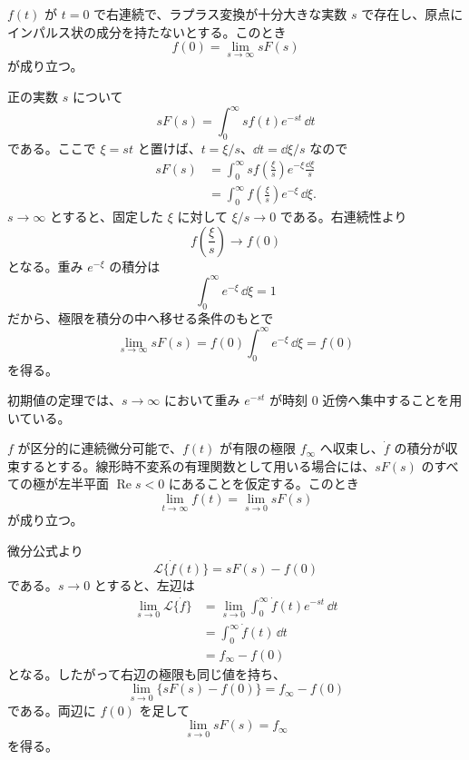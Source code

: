 \begin{theorem}[初期値の定理]
$f(t)$ が $t=0$ で右連続で、ラプラス変換が十分大きな実数 $s$ で存在し、原点にインパルス状の成分を持たないとする。このとき
\begin{equation}
  f(0)=\lim_{s\to\infty}sF(s)
  \label{eq:initial-value-theorem}
\end{equation}
が成り立つ。
\end{theorem}

正の実数 $s$ について
\begin{equation}
  sF(s)=\int_0^\infty s f(t)e^{-st}\,\dd t
\end{equation}
である。ここで $\xi=st$ と置けば、$t=\xi/s$、$\dd t=\dd\xi/s$ なので
\begin{align}
  sF(s)
  &=\int_0^\infty s f\left(\frac{\xi}{s}\right)e^{-\xi}\frac{\dd\xi}{s}\\
  &=\int_0^\infty f\left(\frac{\xi}{s}\right)e^{-\xi}\,\dd\xi.
\end{align}
$s\to\infty$ とすると、固定した $\xi$ に対して $\xi/s\to0$ である。右連続性より
\begin{equation}
  f\left(\frac{\xi}{s}\right)\to f(0)
\end{equation}
となる。重み $e^{-\xi}$ の積分は
\begin{equation}
  \int_0^\infty e^{-\xi}\,\dd\xi=1
\end{equation}
だから、極限を積分の中へ移せる条件のもとで
\begin{equation}
  \lim_{s\to\infty}sF(s)=f(0)\int_0^\infty e^{-\xi}\,\dd\xi=f(0)
\end{equation}
を得る。

初期値の定理では、$s\to\infty$ において重み $e^{-st}$ が時刻 $0$ 近傍へ集中することを用いている。

\begin{theorem}[最終値の定理]
$f$ が区分的に連続微分可能で、$f(t)$ が有限の極限 $f_\infty$ へ収束し、$\dot{f}$ の積分が収束するとする。線形時不変系の有理関数として用いる場合には、$sF(s)$ のすべての極が左半平面 $\operatorname{Re}s<0$ にあることを仮定する。このとき
\begin{equation}
  \lim_{t\to\infty}f(t)=\lim_{s\to0}sF(s)
  \label{eq:final-value-theorem}
\end{equation}
が成り立つ。
\end{theorem}

微分公式より
\begin{equation}
  \mathcal{L}\{\dot{f}(t)\}=sF(s)-f(0)
\end{equation}
である。$s\to0$ とすると、左辺は
\begin{align}
  \lim_{s\to0}\mathcal{L}\{\dot{f}\}
  &=\lim_{s\to0}\int_0^\infty \dot{f}(t)e^{-st}\,\dd t\\
  &=\int_0^\infty \dot{f}(t)\,\dd t\\
  &=f_\infty-f(0)
\end{align}
となる。したがって右辺の極限も同じ値を持ち、
\begin{equation}
  \lim_{s\to0}\{sF(s)-f(0)\}=f_\infty-f(0)
\end{equation}
である。両辺に $f(0)$ を足して
\begin{equation}
  \lim_{s\to0}sF(s)=f_\infty
\end{equation}
を得る。

